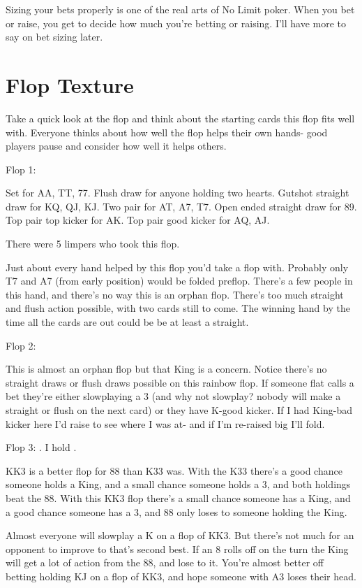 Sizing your bets properly is one of the real arts of No Limit poker.
When you bet or raise, you get to decide how much you're betting
or raising. I'll have more to say on bet sizing later.

\section{Flop Texture}

Take a quick look at the flop and think about the starting cards this
flop fits well with. Everyone thinks about how well the flop helps
their own hands- good players pause and consider how well it helps others.

Flop 1: \Ah\tenh\sevs

Set for AA, TT, 77. Flush draw for anyone holding two hearts.
Gutshot straight draw for KQ, QJ, KJ. Two pair for AT, A7, T7.
Open ended straight draw for 89. Top pair top kicker for AK. Top pair
good kicker for AQ, AJ.

There were 5 limpers who took this flop.

Just about every hand helped by this flop you'd take a flop with.
Probably only T7 and A7 (from early position) would be folded preflop.
There's a few people in this hand, and there's no way this is an orphan
flop. There's too much straight and flush action possible, with two
cards still to come. The winning hand by the time all the cards are
out could be be at least a straight.

Flop 2: \Kh\tred\tres

This is almost an orphan flop but that King is a concern. Notice
there's no straight draws or flush draws possible on this rainbow flop.
If someone flat calls a bet they're either slowplaying a 3
(and why not slowplay? nobody will make a straight or flush on the next card)
or they have K-good kicker. If I had King-bad kicker here I'd raise to see
where I was at- and if I'm re-raised big I'll fold.

Flop 3: \Kh\Kd\treh. I hold \eigc\eigd.

KK3 is a better flop for 88 than K33 was. With the K33 there's a good
chance someone holds a King, and a small chance someone holds a 3,
and both holdings beat the 88. With this KK3 flop there's a small chance
someone has a King, and a good chance someone has a 3, and 88 only loses
to someone holding the King.

Almost everyone will slowplay a K on a flop of KK3. But there's not much
for an opponent to improve to that's second best. If an 8 rolls off on
the turn the King will get a lot of action from the 88, and lose to it.
You're almost better off betting holding KJ on a flop of KK3, and hope
someone with A3 loses their head.

